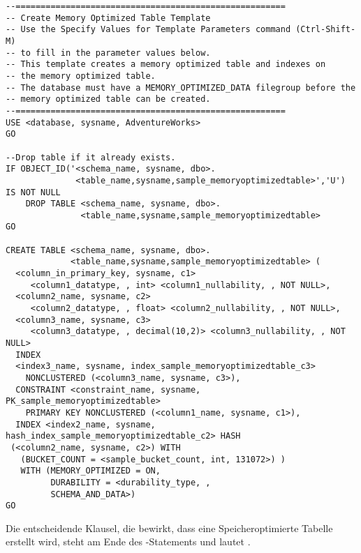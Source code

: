           \begin{lstlisting}[language=ms_sql, caption={Erstellen einer
          Speicheroptimierten Tabelle}, label=admin05_05]
--======================================================
-- Create Memory Optimized Table Template
-- Use the Specify Values for Template Parameters command (Ctrl-Shift-M)
-- to fill in the parameter values below.
-- This template creates a memory optimized table and indexes on
-- the memory optimized table.
-- The database must have a MEMORY_OPTIMIZED_DATA filegroup before the
-- memory optimized table can be created.
--======================================================
USE <database, sysname, AdventureWorks>
GO

--Drop table if it already exists.
IF OBJECT_ID('<schema_name, sysname, dbo>.
              <table_name,sysname,sample_memoryoptimizedtable>','U') IS NOT NULL
    DROP TABLE <schema_name, sysname, dbo>.
               <table_name,sysname,sample_memoryoptimizedtable>
GO

CREATE TABLE <schema_name, sysname, dbo>.
             <table_name,sysname,sample_memoryoptimizedtable> (
  <column_in_primary_key, sysname, c1> 
     <column1_datatype, , int> <column1_nullability, , NOT NULL>, 
  <column2_name, sysname, c2> 
     <column2_datatype, , float> <column2_nullability, , NOT NULL>,
  <column3_name, sysname, c3> 
     <column3_datatype, , decimal(10,2)> <column3_nullability, , NOT NULL>
  INDEX
  <index3_name, sysname, index_sample_memoryoptimizedtable_c3> 
    NONCLUSTERED (<column3_name, sysname, c3>),
  CONSTRAINT <constraint_name, sysname, PK_sample_memoryoptimizedtable> 
    PRIMARY KEY NONCLUSTERED (<column1_name, sysname, c1>),
  INDEX <index2_name, sysname, hash_index_sample_memoryoptimizedtable_c2> HASH
 (<column2_name, sysname, c2>) WITH 
   (BUCKET_COUNT = <sample_bucket_count, int, 131072>) )
   WITH (MEMORY_OPTIMIZED = ON, 
         DURABILITY = <durability_type, ,
         SCHEMA_AND_DATA>)
GO
          \end{lstlisting}
          Die entscheidende Klausel, die bewirkt, dass eine Speicheroptimierte
          Tabelle erstellt wird, steht am Ende des -Statements und lautet .
          
